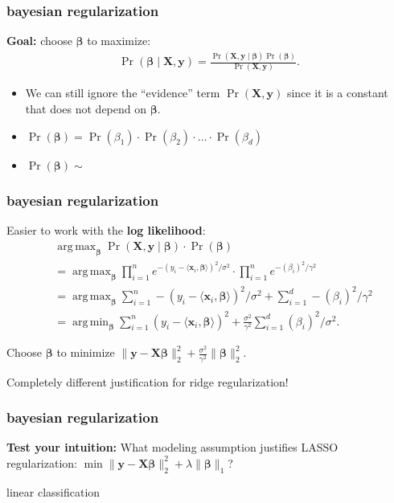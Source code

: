 \documentclass[handout,compress]{beamer}
\newcommand{\bs}[1]{\boldsymbol{#1}}
\newcommand{\bv}[1]{\mathbf{#1}}
\DeclareMathOperator*{\argmin}{arg\,min}
\DeclareMathOperator*{\argmax}{arg\,max}
\begin{document}
\begin{frame}
	\frametitle{bayesian regularization}
	\textbf{Goal:}  choose $\bs{\beta}$ to maximize:
	\begin{align*}
		\Pr(\bs{\beta} \mid \bv{X},\bv{y} )  = \frac{\Pr(\bv{X},\bv{y} \mid  \bs{\beta} ) \Pr(\bs{\beta} )  }{\Pr(\bv{X},\bv{y} )} .
	\end{align*}
	\begin{itemize}
	\item We can still ignore the ``evidence'' term $\Pr(\bv{X},\bv{y})$ since it is a constant that does not depend on $\bs{\beta}$.
	\item $\Pr(\bs{\beta}) = \Pr({\beta}_1)\cdot  \Pr({\beta}_2)\cdot \ldots \cdot \Pr({\beta}_d)$
	\item $\Pr(\bs{\beta})  \sim $
	\end{itemize}
\end{frame}

\begin{frame}
	\frametitle{bayesian regularization}
	Easier to work with the {\textbf{log likelihood}}:
	\begin{align*}
	&\argmax_{\bs{\beta}}\Pr(\bv{X},\bv{y} \mid  \bs{\beta} ) \cdot \Pr(\bs{\beta} ) \\
	& = \argmax_{\bs{\beta}} \prod_{i=1}^n e^{-(y_i - \langle \bv{x}_i, \bs{\beta} \rangle)^2/\sigma^2} \cdot \prod_{i=1}^n e^{-(\beta_i)^2/\gamma^2} \\ 
	&= \argmax_{\bs{\beta}}  \sum_{i=1}^n -(y_i - \langle \bv{x}_i, \bs{\beta} \rangle)^2/\sigma^2 + \sum_{i=1}^d -(\beta_i)^2/\gamma^2\\
	&= \argmin_{\bs{\beta}}  \sum_{i=1}^n (y_i - \langle \bv{x}_i, \bs{\beta} \rangle)^2+ \frac{\sigma^2 }{\gamma^2}\sum_{i=1}^d (\beta_i)^2/\sigma^2.
	\end{align*}
	
	Choose $\bs{\beta}$ to minimize $\|\bv{y} - \bv{X}\bs{\beta}\|_2^2 + \frac{\sigma^2 }{\gamma^2}\|\bs{\beta}\|_2^2$.
	
	
	\alert{Completely different justification for ridge regularization!}
\end{frame}

\begin{frame}
	\frametitle{bayesian regularization}
	\textbf{Test your intuition:} What modeling assumption justifies LASSO regularization: $\min \|\bv{y} - \bv{X}\bs{\beta}\|_2^2 + \lambda\|\bs{\beta}\|_1$?
\end{frame}

\begin{frame}[standout]
	linear classification
\end{frame}
\end{document}
